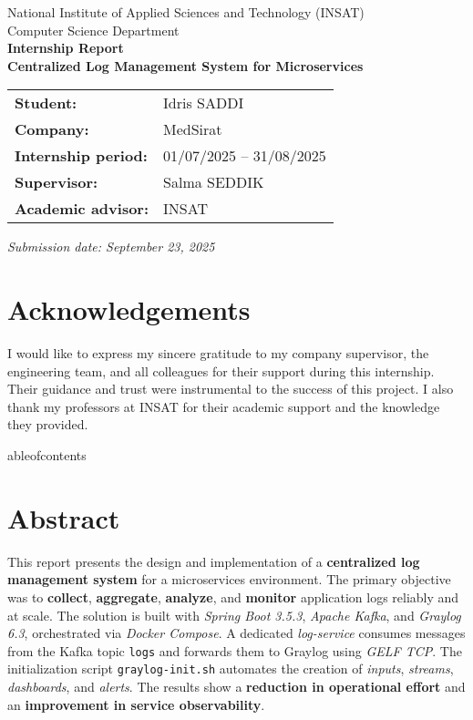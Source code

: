 \documentclass[12pt,a4paper]{report}
\begin{document}
\begin{titlepage}
    \centering
    {\Large National Institute of Applied Sciences and Technology (INSAT)\\[0.25cm]}
    {\large Computer Science Department\\[1.2cm]}
    {\LARGE \textbf{Internship Report}}\\[0.6cm]
    {\Large \textbf{Centralized Log Management System for Microservices}}\\[1.2cm]

  \begin{tabular}{>{\bfseries}p{5cm} p{9cm}}
    Student: & Idris SADDI \\
    Company: & MedSirat \\
    Internship period: & 01/07/2025 -- 31/08/2025 \\
    Supervisor: & Salma SEDDIK \\
    Academic advisor: & INSAT \\
  \end{tabular}

    \vfill

    \vfill
    \large \textit{Submission date: September 23, 2025}
\end{titlepage}

\chapter*{Acknowledgements}
I would like to express my sincere gratitude to my company supervisor, the engineering team, and all colleagues for their support during this internship. Their guidance and trust were instrumental to the success of this project. I also thank my professors at INSAT for their academic support and the knowledge they provided.

	ableofcontents
\listoffigures
\listoftables
\lstlistoflistings
\clearpage
{}

\chapter*{Abstract}
This report presents the design and implementation of a \textbf{centralized log management system} for a microservices environment. The primary objective was to \textbf{collect}, \textbf{aggregate}, \textbf{analyze}, and \textbf{monitor} application logs reliably and at scale. The solution is built with \textit{Spring Boot 3.5.3}, \textit{Apache Kafka}, and \textit{Graylog 6.3}, orchestrated via \textit{Docker Compose}. A dedicated \textit{log-service} consumes messages from the Kafka topic \texttt{logs} and forwards them to Graylog using \textit{GELF TCP}. The initialization script \texttt{graylog-init.sh} automates the creation of \textit{inputs}, \textit{streams}, \textit{dashboards}, and \textit{alerts}. The results show a \textbf{reduction in operational effort} and an \textbf{improvement in service observability}.
\end{document}
